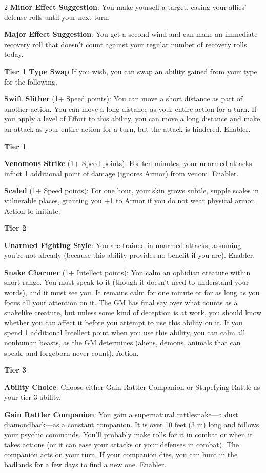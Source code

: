 \begin{multicols}{2}
\textbf{Minor Effect Suggestion}: You make yourself a target, easing your allies’ defense rolls until your next turn. 

\textbf{Major Effect Suggestion}: You get a second wind and can make an immediate recovery roll that doesn’t count against your regular number of recovery rolls today. 

\textbf{Tier 1 Type Swap} 
If you wish, you can swap an ability gained from your type for the following. 

\textbf{Swift Slither} (1+ Speed points): You can move a short distance as part of another action. You can move a long distance as your entire action for a turn. If you apply a level of Effort to this ability, you can move a long distance and make an attack as your entire action for a turn, but the attack is hindered. Enabler. 

\textbf{Tier 1} 

\textbf{Venomous Strike} (1+ Speed points): For ten minutes, your unarmed attacks inflict 1 additional point of damage (ignores Armor) from venom. Enabler. 

\textbf{Scaled} (1+ Speed points): For one hour, your skin grows subtle, supple scales in vulnerable places, granting you +1 to Armor if you do not wear physical armor. Action to initiate. 

\textbf{Tier 2} 

\textbf{Unarmed Fighting Style}: You are trained in unarmed attacks, assuming you’re not already (because this ability provides no benefit if you are). Enabler. 

\textbf{Snake Charmer} (1+ Intellect points): You calm an ophidian creature within short range. You must speak to it (though it doesn’t need to understand your words), and it must see you. It remains calm for one minute or for as long as you focus all your attention on it. The GM has final say over what counts as a snakelike creature, but unless some kind of deception is at work, you should know whether you can affect it before you attempt to use this ability on it. If you spend 1 additional Intellect point when you use this ability, you can calm all nonhuman beasts, as the GM determines (aliens, demons, animals that can speak, and forgeborn never count). Action. 

\textbf{Tier 3} 

\textbf{Ability Choice}: Choose either Gain Rattler Companion or Stupefying Rattle as your tier 3 ability. 

\textbf{Gain Rattler Companion}: You gain a supernatural rattlesnake—a dust diamondback—as a constant companion. It is over 10 feet (3 m) long and follows your psychic commands. You’ll probably make rolls for it in combat or when it takes actions (or it can ease your attacks or your defenses in combat). The companion acts on your turn. If your companion dies, you can hunt in the badlands for a few days to find a new one. Enabler. 


\end{multicols}
